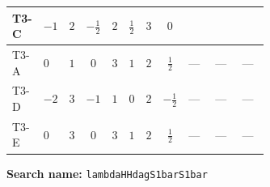 \documentclass[8pt]{article}
\begin{document}
\begin{landscape}
\begin{longtable}{@{}llcccccc >{\raggedright\arraybackslash}p{0.21\linewidth} >{\raggedright\arraybackslash}p{0.21\linewidth} >{\raggedright\arraybackslash}p{0.21\linewidth}@{}}
\midrule
T3-C & $-1$ & $2$ & $-\frac{1}{2}$ & $2$ & $\frac{1}{2}$ & $3$ & $0$ & \scriptsize\adjustbox{max width=\linewidth}{$\begin{gathered} +8 {\lambda_{H1}} {\lambda_{H^\dagger H^\dagger S_1^\dagger S_1^\dagger}}\end{gathered}$} & \scriptsize\adjustbox{max width=\linewidth}{$\begin{gathered} +\frac{4 {\lambda_{H1}^{\rm Adj}} {\lambda_{H^\dagger H^\dagger S_1^\dagger S_1^\dagger}}}{3}\end{gathered}$} & \scriptsize\adjustbox{max width=\linewidth}{$\begin{gathered} +2 {\lambda_{H^\dagger H^\dagger S_1^\dagger S_1^\dagger}} {\lambda_{S_1}}\end{gathered}$} \\
\midrule
T3-A & $0$ & $1$ & $0$ & $3$ & $1$ & $2$ & $\frac{1}{2}$ & --- & --- & --- \\
\midrule
T3-D & $-2$ & $3$ & $-1$ & $1$ & $0$ & $2$ & $-\frac{1}{2}$ & --- & --- & --- \\
\midrule
T3-E & $0$ & $3$ & $0$ & $3$ & $1$ & $2$ & $\frac{1}{2}$ & --- & --- & --- \\
\midrule
\bottomrule
\end{longtable}
\clearpage
\noindent\textbf{Search name: }\texttt{lambdaHHdagS1barS1bar}\par\smallskip

\end{landscape}
\end{document}
